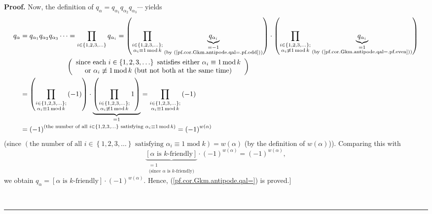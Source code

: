 \documentclass[numbers=enddot,12pt,final,onecolumn,notitlepage]{scrartcl}%
\theoremstyle{definition}
\newenvironment{proof}[1][Proof]{\noindent\textbf{#1.} }{\ \rule{0.5em}{0.5em}}
\let\prodnonlimits\prod
\renewcommand{\prod}{\prodnonlimits\limits}
\newenvironment{verlong}{}{}
\begin{document}
\begin{proof}
\begin{verlong}
Now, the definition of $q_{\alpha}=q_{\alpha_{1}}q_{\alpha_{2}}q_{\alpha_{3}%
}\cdots$ yields%
\begin{align*}
q_{\alpha}  &  =q_{\alpha_{1}}q_{\alpha_{2}}q_{\alpha_{3}}\cdots=\prod
_{i\in\left\{  1,2,3,\ldots\right\}  }q_{\alpha_{i}}=\left(  \prod
_{\substack{i\in\left\{  1,2,3,\ldots\right\}  ;\\\alpha_{i}\equiv
1\operatorname{mod}k}}\underbrace{q_{\alpha_{i}}}_{\substack{=-1\\\text{(by
(\ref{pf.cor.Gkm.antipode.qal=.pf.odd}))}}}\right)  \cdot\left(
\prod_{\substack{i\in\left\{  1,2,3,\ldots\right\}  ;\\\alpha_{i}%
\not \equiv 1\operatorname{mod}k}}\underbrace{q_{\alpha_{i}}}%
_{\substack{=1\\\text{(by (\ref{pf.cor.Gkm.antipode.qal=.pf.even}))}}}\right)
\\
&  \ \ \ \ \ \ \ \ \ \ \ \ \ \ \ \ \ \ \ \ \left(
\begin{array}
[c]{c}%
\text{since each }i\in\left\{  1,2,3,\ldots\right\}  \text{ satisfies either
}\alpha_{i}\equiv1\operatorname{mod}k\\
\text{or }\alpha_{i}\not \equiv 1\operatorname{mod}k\text{ (but not both at
the same time)}%
\end{array}
\right) \\
&  =\left(  \prod_{\substack{i\in\left\{  1,2,3,\ldots\right\}  ;\\\alpha
_{i}\equiv1\operatorname{mod}k}}\left(  -1\right)  \right)  \cdot
\underbrace{\left(  \prod_{\substack{i\in\left\{  1,2,3,\ldots\right\}
;\\\alpha_{i}\not \equiv 1\operatorname{mod}k}}1\right)  }_{=1}=\prod
_{\substack{i\in\left\{  1,2,3,\ldots\right\}  ;\\\alpha_{i}\equiv
1\operatorname{mod}k}}\left(  -1\right) \\
&  =\left(  -1\right)  ^{\left(  \text{the number of all }i\in\left\{
1,2,3,\ldots\right\}  \text{ satisfying }\alpha_{i}\equiv1\operatorname{mod}%
k\right)  }=\left(  -1\right)  ^{w\left(  \alpha\right)  }%
\end{align*}
(since $\left(  \text{the number of all }i\in\left\{  1,2,3,\ldots\right\}
\text{ satisfying }\alpha_{i}\equiv1\operatorname{mod}k\right)  =w\left(
\alpha\right)  $ (by the definition of $w\left(  \alpha\right)  $)). Comparing
this with%
\[
\underbrace{\left[  \alpha\text{ is }k\text{-friendly}\right]  }%
_{\substack{=1\\\text{(since }\alpha\text{ is }k\text{-friendly)}}%
}\cdot\left(  -1\right)  ^{w\left(  \alpha\right)  }=\left(  -1\right)
^{w\left(  \alpha\right)  },
\]
we obtain $q_{\alpha}=\left[  \alpha\text{ is }k\text{-friendly}\right]
\cdot\left(  -1\right)  ^{w\left(  \alpha\right)  }$. Hence,
(\ref{pf.cor.Gkm.antipode.qal=}) is proved.]
\end{verlong}


\end{proof}
\end{document}
